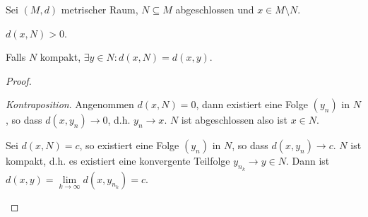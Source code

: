 \begin{prop}
\label{prop:3.4}
Sei $(M,d)$ metrischer Raum, $N\subseteq M$ abgeschlossen und $x\in M\setminus
N$.
\begin{propenum}
  \item $d(x,N)> 0$.
  \item Falls $N$ kompakt, $\exists y\in N : d(x,N)=d(x,y)$.\fishhere
\end{propenum}
\end{prop}

\begin{proof}
\begin{proofenum}
  \item \textit{Kontraposition}. Angenommen $d(x,N)=0$, dann existiert eine
  Folge $(y_n)$ in $N$, so dass $d(x,y_n)\to 0$, d.h. $y_n\to x$. $N$ ist
  abgeschlossen also ist $x\in N$.
  \item Sei $d(x,N)=c$, so existiert eine Folge $(y_n)$ in $N$, so dass
  $d(x,y_n)\to c$. $N$ ist kompakt, d.h. es existiert eine konvergente
  Teilfolge $y_{n_k}\to y\in N$. Dann ist
  $d(x,y)=\lim\limits_{k\to\infty} d(x,y_{n_k})=c$.\qedhere
\end{proofenum}
\end{proof}

